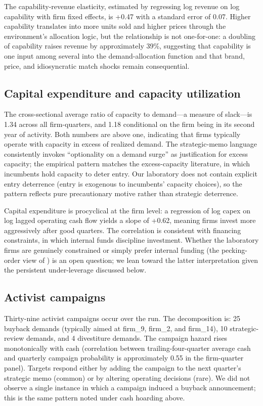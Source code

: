 \documentclass[11pt]{article}
\begin{document}
The capability-revenue elasticity, estimated by regressing log revenue
on log capability with firm fixed effects, is +0.47 with a standard
error of 0.07. Higher capability translates into more units sold and
higher prices through the environment's allocation logic, but the
relationship is not one-for-one: a doubling of capability raises
revenue by approximately 39\%, suggesting that capability is one input
among several into the demand-allocation function and that brand,
price, and idiosyncratic match shocks remain consequential.

\subsection{Capital expenditure and capacity utilization}

The cross-sectional average ratio of capacity to demand---a measure of
slack---is 1.34 across all firm-quarters, and 1.18 conditional on the
firm being in its second year of activity. Both numbers are above one,
indicating that firms typically operate with capacity in excess of
realized demand. The strategic-memo language consistently invokes
``optionality on a demand surge'' as justification for excess
capacity; the empirical pattern matches the
\citet{ghemawat1985capacity} excess-capacity literature, in which
incumbents hold capacity to deter entry. Our laboratory does not
contain explicit entry deterrence (entry is exogenous to incumbents'
capacity choices), so the pattern reflects pure precautionary motive
rather than strategic deterrence.

Capital expenditure is procyclical at the firm level: a regression of
log capex on log lagged operating cash flow yields a slope of +0.62,
meaning firms invest more aggressively after good quarters. The
correlation is consistent with \citet{fazzari1988financing} financing
constraints, in which internal funds discipline investment. Whether
the laboratory firms are genuinely constrained or simply prefer
internal funding (the pecking-order view of \citealp{myersmajluf1984})
is an open question; we lean toward the latter interpretation given
the persistent under-leverage discussed below.

\subsection{Activist campaigns}\label{sec:activist}

Thirty-nine activist campaigns occur over the run. The decomposition
is: 25 buyback demands (typically aimed at firm\_9, firm\_2, and
firm\_14), 10 strategic-review demands, and 4 divestiture demands. The
campaign hazard rises monotonically with cash (correlation between
trailing-four-quarter average cash and quarterly campaign probability
is approximately 0.55 in the firm-quarter panel). Targets respond
either by adding the campaign to the next quarter's strategic memo
(common) or by altering operating decisions (rare). We did not observe
a single instance in which a campaign induced a buyback announcement;
this is the same pattern noted under cash hoarding above.
\end{document}
